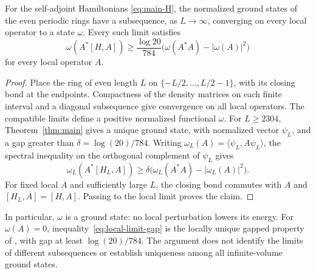 \begin{corollary}\label{cor:local-limit}
For the self-adjoint Hamiltonians \eqref{eq:main-H}, the normalized
ground states of the even periodic rings have a subsequence, as
$L\to\infty$, converging on every local operator to a state $\omega$.
Every such limit satisfies
\begin{equation}\label{eq:local-limit-gap}
 \omega(A^*[H,A])\ge\frac{\log20}{784}
 \bigl(\omega(A^*A)-|\omega(A)|^2\bigr)
\end{equation}
for every local operator $A$.
\end{corollary}

\begin{proof}
Place the ring of even length $L$ on
$\{-L/2,\ldots,L/2-1\}$, with its closing bond at the endpoints.
Compactness of the density matrices on each finite interval and a
diagonal subsequence give convergence on all local operators. The
compatible limits define a positive normalized functional $\omega$.
For $L\ge2304$, Theorem~\ref{thm:main} gives a unique ground state,
with normalized vector $\psi_L$, and a gap greater than
$\delta=\log(20)/784$.
Writing $\omega_L(A)=\langle\psi_L,A\psi_L\rangle$, the spectral
inequality on the orthogonal complement of $\psi_L$ gives
\[
 \omega_L(A^*[H_L,A])\ge\delta
 \bigl(\omega_L(A^*A)-|\omega_L(A)|^2\bigr).
\]
For fixed local $A$ and sufficiently large $L$, the closing bond commutes
with $A$ and $[H_L,A]=[H,A]$. Passing to the local limit proves the claim.
\end{proof}

In particular, $\omega$ is a ground state: no local perturbation lowers
its energy. For $\omega(A)=0$, inequality~\eqref{eq:local-limit-gap}
is the locally unique gapped property of
\cite[arXiv v4, Definition~11]{Tasaki2025}, with gap at least
$\log(20)/784$. The argument does not identify the limits of different
subsequences or establish uniqueness among all infinite-volume ground
states.

